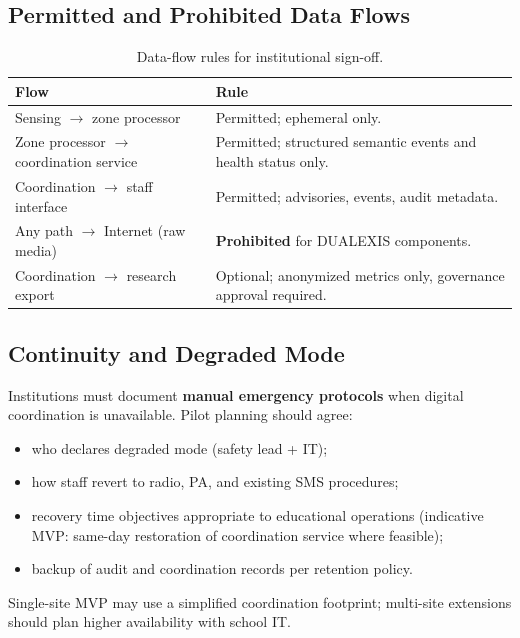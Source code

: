 \subsection{Permitted and Prohibited Data Flows}

\begin{table}[htbp]
  \centering
  \caption{Data-flow rules for institutional sign-off.}
  \label{tab:data-flows}
  \small
  \begin{tabular}{@{}p{4.2cm}p{7.8cm}@{}}
    \toprule
    Flow & Rule \\
    \midrule
    Sensing $\rightarrow$ zone processor &
      Permitted; ephemeral only. \\
    Zone processor $\rightarrow$ coordination service &
      Permitted; structured semantic events and health status only. \\
    Coordination $\rightarrow$ staff interface &
      Permitted; advisories, events, audit metadata. \\
    Any path $\rightarrow$ Internet (raw media) &
      \textbf{Prohibited} for DUALEXIS components. \\
    Coordination $\rightarrow$ research export &
      Optional; anonymized metrics only, governance approval required. \\
    \bottomrule
  \end{tabular}
\end{table}

\subsection{Continuity and Degraded Mode}

Institutions must document \textbf{manual emergency protocols} when digital coordination
is unavailable.
Pilot planning should agree:

\begin{itemize}[noitemsep]
  \item who declares degraded mode (safety lead + IT);
  \item how staff revert to radio, PA, and existing SMS procedures;
  \item recovery time objectives appropriate to educational operations (indicative MVP:
        same-day restoration of coordination service where feasible);
  \item backup of audit and coordination records per retention policy.
\end{itemize}

Single-site MVP may use a simplified coordination footprint; multi-site extensions
should plan higher availability with school IT.

